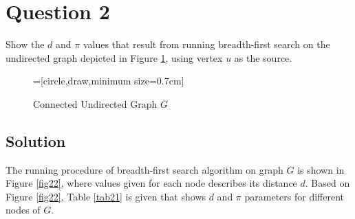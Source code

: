 
\section*{Question 2}

Show the $d$ and $\pi$ values that result from running breadth-first search on the undirected graph depicted in Figure \ref{fig21}, using vertex $u$ as the source.

\def\dist{1cm}
\begin{figure}[H]\centering
{}=[circle,draw,minimum size=0.7cm]
\caption{Connected Undirected Graph $G$}\label{fig21}
\end{figure}

\subsection*{Solution}

The running procedure of breadth-first search algorithm on graph $G$ is shown in Figure \ref{fig22}, where values given for each node describes its distance $d$.
Based on Figure \ref{fig22}, Table \ref{tab21} is given that shows $d$ and $\pi$ parameters for different nodes of $G$.

